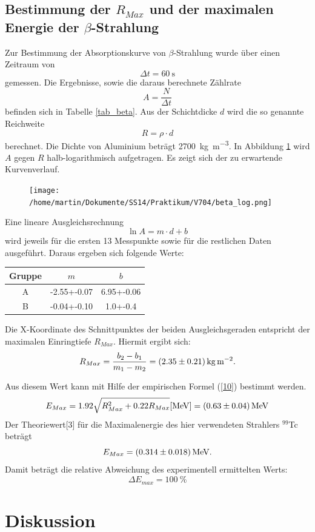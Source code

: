 \documentclass[11pt,ngerman,a4paper]{article}
\begin{document}
\subsection{Bestimmung der $R_{Max}$ und der maximalen Energie der $\beta$-Strahlung}
Zur Bestimmung der Absorptionskurve von $\beta$-Strahlung wurde über einen Zeitraum von
\[
\Delta t = \SI{60}{\second}
\]
gemessen. Die Ergebnisse, sowie die daraus berechnete Zählrate
\[
A = \frac{N}{\Delta t}
\]
befinden sich in Tabelle \ref{tab_beta}. Aus der Schichtdicke $d$ wird die so genannte Reichweite
\[
R= \rho\cdot d
\]berechnet. Die Dichte von Aluminium beträgt \SI{2700}{\kilo\gram\per\meter\cubed}. In Abbildung \ref{abb_beta} wird $A$ gegen $R$ halb-logarithmisch aufgetragen. Es zeigt sich der zu erwartende Kurvenverlauf. 
\begin{figure}[htp]
\centering
\texttt{[image: /home/martin/Dokumente/SS14/Praktikum/V704/beta\_log.png]}
\caption{}
\label{abb_beta}
\end{figure}
\newpage
Eine lineare Ausgleichsrechnung
\[
\ln{A} = m\cdot d + b
\]
wird jeweils für die ersten 13 Messpunkte sowie für die restlichen Daten ausgeführt. Daraus ergeben sich folgende Werte:
\begin{table}[h]
\centering
\begin{tabular}{cSS}
	\toprule
	Gruppe & $m$ & $b$\\
	\midrule
	A &-2.55+-0.07& 6.95+-0.06\\
	B &-0.04+-0.10& 1.0+-0.4\\
	\bottomrule
\end{tabular}

\end{table}
Die X-Koordinate des Schnittpunktes der beiden Ausgleichsgeraden entspricht der maximalen Einringtiefe $R_{Max}$. Hiermit ergibt sich:
\begin{equation}
R_{Max} = \frac{b_2-b_1}{m_1-m_2} = \SI{ 2.35+-0.21}{\kilo\gram\per\meter\squared}.
\end{equation}

Aus diesem Wert kann mit Hilfe der empirischen Formel (\ref{10}) bestimmt werden.
\[
E_{Max} = 1.92\sqrt{R_{Max}^2+0.22R_{Max}}[\si{\mega\eV}] = \SI{0.63+-0.04}{\mega\eV}
\]
Der Theoriewert[3] für die Maximalenergie des hier verwendeten Strahlers ${}^{99}$Tc beträgt
\[
E_{Max} = \SI{0.314+-0.018}{\mega\eV}.
\]
Damit beträgt die relative Abweichung des experimentell ermittelten Werts:
\[
\Delta E_{max} = \SI{100}{\percent}
\]
\section{Diskussion}
\end{document}
